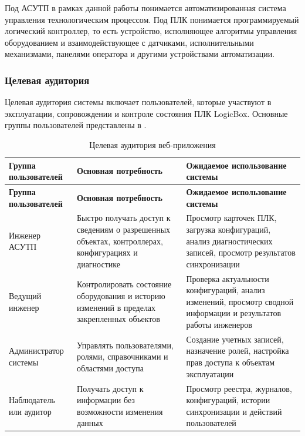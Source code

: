 Под АСУТП в рамках данной работы понимается автоматизированная система
управления технологическим процессом. Под ПЛК понимается программируемый
логический контроллер, то есть устройство, исполняющее алгоритмы управления
оборудованием и взаимодействующее с датчиками, исполнительными механизмами,
панелями оператора и другими устройствами автоматизации.

\subsubsection{Целевая аудитория}

Целевая аудитория системы включает пользователей, которые участвуют в
эксплуатации, сопровождении и контроле состояния ПЛК LogicBox. Основные группы
пользователей представлены в .

\begin{longtable}{|p{}|p{}|p{}|}
    \caption{Целевая аудитория веб-приложения} \label{tab:target_audience} \\
    \hline
    \textbf{Группа пользователей} & \textbf{Основная потребность} & \textbf{Ожидаемое использование системы} \\ \hline
    \endfirsthead

    \tabcont{\ref{tab:target_audience}}
    \textbf{Группа пользователей} & \textbf{Основная потребность} & \textbf{Ожидаемое использование системы} \\ \hline
    \endhead

    \hline
    \endfoot

    \hline
    \endlastfoot

    Инженер АСУТП & Быстро получать доступ к сведениям о разрешенных объектах, контроллерах, конфигурациях и диагностике & Просмотр карточек ПЛК, загрузка конфигураций, анализ диагностических записей, просмотр результатов синхронизации \\ \hline
    Ведущий инженер & Контролировать состояние оборудования и историю изменений в пределах закрепленных объектов & Проверка актуальности конфигураций, анализ изменений, просмотр сводной информации и результатов работы инженеров \\ \hline
    Администратор системы & Управлять пользователями, ролями, справочниками и областями доступа & Создание учетных записей, назначение ролей, настройка прав доступа к объектам эксплуатации \\ \hline
    Наблюдатель или аудитор & Получать доступ к информации без возможности изменения данных & Просмотр реестра, журналов, конфигураций, истории синхронизации и действий пользователей \\ \hline
\end{longtable}

